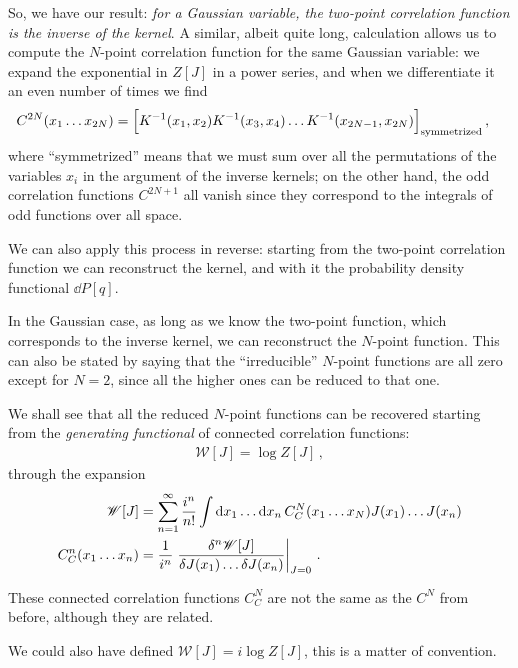 \documentclass[main.tex]{subfiles}
\begin{document}
So, we have our result: \emph{for a Gaussian variable, the two-point correlation function is the inverse of the kernel}. 
A similar, albeit quite long, calculation allows us to compute the \(N\)-point correlation function for the same Gaussian variable: we expand the exponential in \(Z[J]\) in a power series, and when we differentiate it an even number of times we find  
%
\begin{align}
C^{2N}(x_1 \dots x_{2N}) &= \qty[K^{-1}(x_1, x_2 ) K^{-1} (x_3, x_4) \dots K^{-1} (x_{2N-1}, x_{2N})]_{\text{symmetrized}}
\,,
\end{align}
%
where ``symmetrized'' means that we must sum over all the permutations of the variables \(x_i\) in the argument of the inverse kernels; on the other hand, the odd correlation functions \(C^{2N+1}\) all vanish since they correspond to the integrals of odd functions over all space.

We can also apply this process in reverse: starting from the two-point correlation function we can reconstruct the kernel, and with it the probability density functional \(\dd{P}[q]\). 

In the Gaussian case, as long as we know the two-point function, which corresponds to the inverse kernel, we can reconstruct the \(N\)-point function. 
This can also be stated by saying that the ``irreducible'' \(N\)-point functions are all zero except for \(N=2\), since all the higher ones can be reduced to that one. 

We shall see that all the reduced \(N\)-point functions can be recovered starting from the \emph{generating functional} of connected correlation functions:
%
\begin{align}
\mathscr{W}[J] = \log Z[J]
\,,
\end{align}
%
through the expansion 
%
\begin{align}
\mathscr{W}[J] &= \sum _{n=1}^{\infty } \frac{i^{n}}{n!} \int \dd{x_1} \dots \dd{x_n} C^{N}_{C} (x_1 \dots x_N) J(x_1) \dots J(x_n)  \\
C^{n}_C (x_1 \dots x_n) &= \frac{1}{i^{n}} 
\eval{\frac{ \delta^{n} \mathscr{W}[J]}{\delta  J(x_1) \dots \delta J(x_n) }}_{J = 0}
\,.
\end{align}

These connected correlation functions \(C^{N}_{C}\) are not the same as the \(C^{N}\) from before, although they are related.

We could also have defined \(\mathscr{W}[J] = i \log Z[J]\), this is a matter of convention. 
\end{document}
